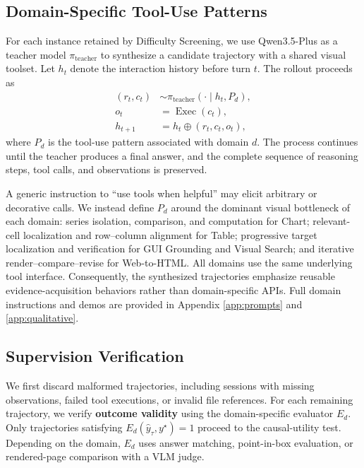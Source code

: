 \subsection{Domain-Specific Tool-Use Patterns}
\label{sec:synthesis}

For each instance retained by Difficulty Screening, we use Qwen3.5-Plus as a teacher model $\pi_{\text{teacher}}$ to synthesize a candidate trajectory with a shared visual toolset. 
Let $h_t$ denote the interaction history before turn $t$. 
The rollout proceeds as
\begin{equation}
\begin{aligned}
(r_t,c_t)
&\sim \pi_{\mathrm{teacher}}(\cdot\mid h_t,P_d), \\
o_t
&=\operatorname{Exec}(c_t), \\
h_{t+1}
&=h_t\oplus(r_t,c_t,o_t),
\end{aligned}
\label{eq:teacher-rollout}
\end{equation}
where $P_d$ is the tool-use pattern associated with domain $d$. 
The process continues until the teacher produces a final answer, and the complete sequence of reasoning steps, tool calls, and observations is preserved.

A generic instruction to ``use tools when helpful'' may elicit arbitrary or decorative calls. We instead define $P_d$ around the dominant visual bottleneck of each domain: series isolation, comparison, and computation for Chart; relevant-cell localization and row--column alignment for Table; progressive target localization and verification for GUI Grounding and Visual Search; and iterative render--compare--revise for Web-to-HTML. All domains use the same underlying tool interface. Consequently, the synthesized trajectories emphasize reusable evidence-acquisition behaviors rather than domain-specific APIs. Full domain instructions and demos are provided in Appendix \ref{app:prompts} and \ref{app:qualitative}.


\subsection{Supervision Verification}
\label{sec:filtering}

We first discard malformed trajectories, including sessions with missing observations, failed tool executions, or invalid file references. 
For each remaining trajectory, we verify \textbf{outcome validity} using the domain-specific evaluator $E_d$.
Only trajectories satisfying $E_d(\hat{y}_\tau,y^\star)=1$ proceed to the causal-utility test.
Depending on the domain, $E_d$ uses answer matching, point-in-box evaluation, or rendered-page comparison with a VLM judge.


